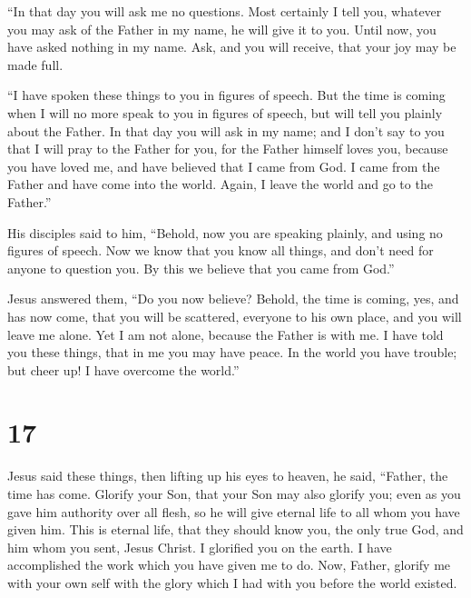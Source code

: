  ``In that day you will ask me no questions. Most
certainly I tell you, whatever you may ask of the Father in my name, he
will give it to you.  Until now, you have asked nothing
in my name. Ask, and you will receive, that your joy may be made full.

 ``I have spoken these things to you in figures of
speech. But the time is coming when I will no more speak to you in
figures of speech, but will tell you plainly about the Father.
 In that day you will ask in my name; and I don't say to
you that I will pray to the Father for you,  for the
Father himself loves you, because you have loved me, and have believed
that I came from God.  I came from the Father and have
come into the world. Again, I leave the world and go to the Father.''

 His disciples said to him, ``Behold, now you are
speaking plainly, and using no figures of speech.  Now we
know that you know all things, and don't need for anyone to question
you. By this we believe that you came from God.''

 Jesus answered them, ``Do you now believe?
 Behold, the time is coming, yes, and has now come, that
you will be scattered, everyone to his own place, and you will leave me
alone. Yet I am not alone, because the Father is with me.
 I have told you these things, that in me you may have
peace. In the world you have trouble; but cheer up! I have overcome the
world.''

\hypertarget{section-16}{%
\section{17}\label{section-16}}

 Jesus said these things, then lifting up his eyes to
heaven, he said, ``Father, the time has come. Glorify your Son, that
your Son may also glorify you;  even as you gave him
authority over all flesh, so he will give eternal life to all whom you
have given him.  This is eternal life, that they should
know you, the only true God, and him whom you sent, Jesus Christ.
 I glorified you on the earth. I have accomplished the
work which you have given me to do.  Now, Father, glorify
me with your own self with the glory which I had with you before the
world existed.

